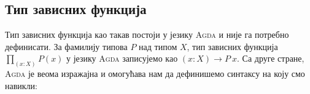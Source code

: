 
\subsection{Тип зависних функција}

Тип зависних функција као такав постоји у језику \textsc{Agda} и није га потребно дефинисати. За фамилију типова $P$ над типом $X$, тип зависних функција $\prod_{(x : X)} P (x)$ у језику \textsc{Agda} записујемо као $(x : X) \to P~x$. Са друге стране, \textsc{Agda} је веома изражајна и омогућава нам да дефинишемо синтаксу на коју смо навикли:

